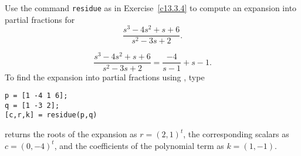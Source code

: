 \documentclass{ximera}
\begin{document}
\begin{computerExercise} \label{c13.3.4b}
Use the command {\tt residue} as in Exercise~\ref{c13.3.4} to compute an 
expansion into partial fractions for
\[
\frac{s^3-4s^2+s+6}{s^2-3s+2}.
\]

\begin{solution}

\ans
\[
\frac{s^3 - 4s^2 + s + 6}{s^2 - 3s + 2}
= \frac{-4}{s - 1} + s - 1.
\]
\soln To find the expansion into partial fractions using \Matlabp, type
\begin{verbatim}
p = [1 -4 1 6];
q = [1 -3 2];
[c,r,k] = residue(p,q)
\end{verbatim}
\Matlab returns the roots of the expansion as $r = (2,1)^t$, the
corresponding scalars as $c = (0,-4)^t$, and the coefficients of the
polynomial term as $k = (1,-1)$.




\end{solution}
\end{computerExercise}
\end{document}
